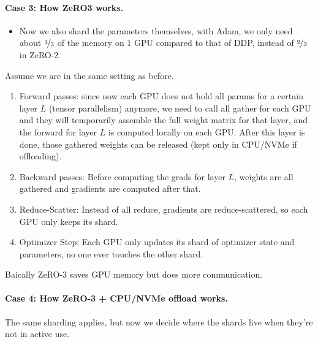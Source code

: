 \documentclass[11pt]{article}  %
\begin{document}
\paragraph{Case 3: How ZeRO3 works.}
\begin{itemize}
  \item Now we also shard the parameters themselves, with Adam, we only need about $\nicefrac{1}{3}$ of the memory on $1$ GPU compared to that of DDP, instead of $\nicefrac{2}{3}$ in ZeRO-2.
\end{itemize}

Assume we are in the same setting as before.
\begin{enumerate}
  \item Forward passes: since now each GPU does not hold all params for a certain layer $L$ (tensor parallelism) anymore, we need to call all gather for each GPU and they will temporarily assemble the full weight matrix for that layer, and the forward for layer $L$ is computed locally on each GPU.
  After this layer is done, those gathered weights can be released (kept only in CPU/NVMe if offloading).

  \item Backward passes: Before computing the grads for layer $L$, weights are all gathered and gradients are computed after that.
  
  \item Reduce-Scatter: Instead of all reduce, gradients are reduce-scattered, so each GPU only keeps its shard.
  
  \item Optimizer Step: Each GPU only updates its shard of optimizer state and parameters, no one ever touches the other shard. 
\end{enumerate}
Baically ZeRO-3 saves GPU memory but does more communication.


\paragraph{Case 4: How ZeRO-3 + CPU/NVMe offload works.}
The same sharding applies, but now we decide where the shards live when they're not in active use.
\end{document}
